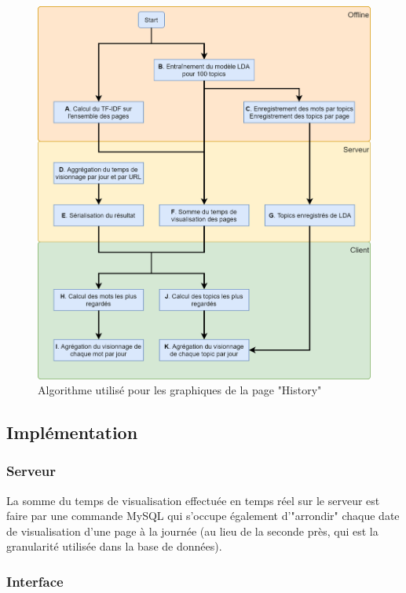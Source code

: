 			\begin{figure}[!h]
				\centering
				\includegraphics[height=1.15\textwidth]{images/design/pages/history_algo}
				\caption{Algorithme utilisé pour les graphiques de la page "History"}
				\label{history_algo}
			\end{figure}

	\subsection{Implémentation}

		\subsubsection{Serveur}

			La somme du temps de visualisation effectuée en temps réel sur le serveur est faire par une commande MySQL qui s'occupe également d'"arrondir" chaque date de visualisation d'une page à la journée (au lieu de la seconde près, qui est la granularité utilisée dans la base de données).

		\subsubsection{Interface}

